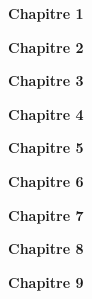  


\ifdefined\COMPLETE
\else
    \newcommand{\COMPLETE}
\fi                        %



\newcommand{\chapitre}[1]{{\bf #1}\medskip}

\chapitre{Chapitre 1}
       
\newpage

\chapitre{Chapitre 2}
       
\newpage

\chapitre{Chapitre 3}
       
\newpage

\chapitre{Chapitre 4}
       
\newpage

\chapitre{Chapitre 5}
       
\newpage

\chapitre{Chapitre 6}
       
\newpage

\chapitre{Chapitre 7}
                                    
\newpage

\chapitre{Chapitre 8}
             
\newpage

\chapitre{Chapitre 9}

